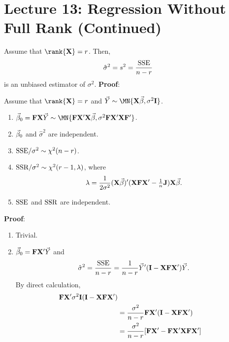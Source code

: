 \section{Lecture 13: Regression Without Full Rank (Continued)}
\begin{Theorem}{}{}
    Assume that $ \rank{\Matrix{X}}=r $. Then,
    \[ \hat{\sigma}^2=s^2=\frac{\text{SSE}}{n-r} \]
    is an unbiased estimator of $\sigma^2$.
    \tcblower{}
    \textbf{Proof}:
\end{Theorem}
\begin{Theorem}{}{}
    Assume that $ \rank{\Matrix{X}}=r $
    and $ \Vector{Y}\sim \MN{\Matrix{X}\Vector{\beta},\sigma^2 \Matrix{I}} $.
    \begin{enumerate}[(1)]
        \item $ \Vector{\beta}_0=\Matrix{F}\Matrix{X}\Vector{Y}\sim \MN{\Matrix{F}\Matrix{X}'\Matrix{X}\Vector{\beta},\sigma^2 \Matrix{F}\Matrix{X}'\Matrix{X}\Matrix{F}'} $.
        \item $ \vec{\beta}_0 $ and $ \hat{\sigma}^2 $ are independent.
        \item $ \text{SSE}/\sigma^2 \sim \chi^2(n-r) $.
        \item $ \text{SSR}/\sigma^2 \sim \chi^2(r-1,\lambda) $, where
              \[ \lambda = \frac{1}{2\sigma^2}(\mathbf{X}\vec{\beta})'(\mathbf{X}\mathbf{F}\mathbf{X}'-\tfrac{1}{n}\mathbf{J})\mathbf{X}\vec{\beta}. \]
        \item $ \text{SSE} $ and $ \text{SSR} $ are independent.
    \end{enumerate}
    \tcblower{}
    \textbf{Proof}:
    \begin{enumerate}[(1)]
        \item Trivial.
        \item $ \vec{\beta}_0=\mathbf{F}\mathbf{X}'\vec{Y} $
              and
              \[ \hat{\sigma}^2=\frac{\text{SSE}}{n-r}=\frac{1}{n-r}\vec{Y}'(\mathbf{I}-\mathbf{X}\mathbf{F}\mathbf{X}')\vec{Y}. \]
              By direct calculation,
              \begin{align*}
                  \Matrix{F}\Matrix{X}'\sigma^2 \Matrix{I}(\Matrix{I}-\Matrix{X}\Matrix{F}\Matrix{X}')                                          \\
                   & =\frac{\sigma^2}{n-r}\Matrix{F}\Matrix{X}'(\Matrix{I}-\Matrix{X}\Matrix{F}\Matrix{X}')                                     \\
                   & =\frac{\sigma^2}{n-r}[\Matrix{F}\Matrix{X}'-\Matrix{F}\Matrix{X}'\Matrix{X}\Matrix{F}\Matrix{X}']                          \\

\end{align*}
\end{enumerate}
\end{Theorem}
